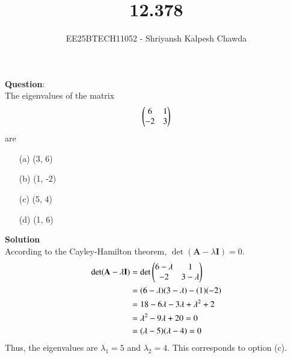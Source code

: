 \documentclass[journal]{IEEEtran}
\begin{document}
	
	
	\vspace{3cm}
	
	\title{12.378}
	\author{EE25BTECH11052 - Shriyansh Kalpesh Chawda}
	{\let\newpage\relax\maketitle}
	
	\renewcommand{\thefigure}{\theenumi}
	\renewcommand{\thetable}{\theenumi}
	\setlength{\intextsep}{10pt} 
	
	\renewcommand{\thetable}{\theenumi}
	\textbf{Question}:\\
	The eigenvalues of the matrix 
	\[
	\begin{pmatrix}6 & 1 \\ -2 & 3\end{pmatrix}
	\]
	are
	
	\begin{multicols}{4}
		\begin{enumerate}
			\item[(a)] (3, 6)
			\item[(b)] (1, -2)
			\item[(c)] (5, 4)
			\item[(d)] (1, 6)
		\end{enumerate}
	\end{multicols}

\textbf{Solution}\\
	According to the Cayley-Hamilton theorem,  $\det(\mathbf{A} - \lambda\mathbf{I}) = 0$.
	\begin{align}
		\det(\mathbf{A} - \lambda\mathbf{I}) &= \det\begin{pmatrix}6-\lambda & 1 \\ -2 & 3-\lambda\end{pmatrix} \\
		&= (6-\lambda)(3-\lambda) - (1)(-2) \\
		&= 18 - 6\lambda - 3\lambda + \lambda^2 + 2 \\
		&= \lambda^2 - 9\lambda + 20 = 0\\
		&=(\lambda - 5)(\lambda - 4) = 0
	\end{align}
	Thus, the eigenvalues are $\lambda_1 = 5$ and $\lambda_2 = 4$. This corresponds to option (c).
	
\end{document}
